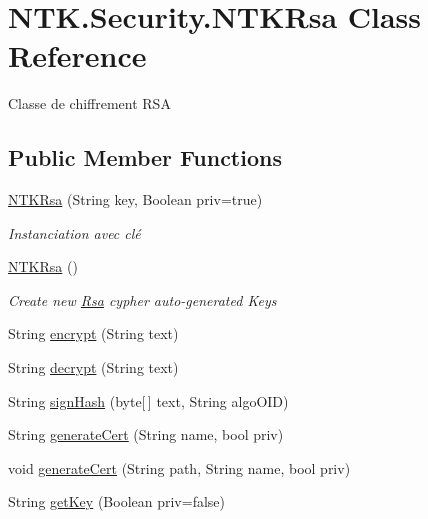 \hypertarget{class_n_t_k_1_1_security_1_1_n_t_k_rsa}{}\section{N\+T\+K.\+Security.\+N\+T\+K\+Rsa Class Reference}
\label{class_n_t_k_1_1_security_1_1_n_t_k_rsa}


Classe de chiffrement R\+SA  


\subsection*{Public Member Functions}
\begin{DoxyCompactItemize}
\item 
\mbox{\hyperlink{class_n_t_k_1_1_security_1_1_n_t_k_rsa_a0b7a720efb1a3d7dad4244581917147c}{N\+T\+K\+Rsa}} (String key, Boolean priv=true)
\begin{DoxyCompactList}\small\item\em Instanciation avec clé \end{DoxyCompactList}\item 
\mbox{\hyperlink{class_n_t_k_1_1_security_1_1_n_t_k_rsa_a9d4783190577624f5db69a347f19a320}{N\+T\+K\+Rsa}} ()
\begin{DoxyCompactList}\small\item\em Create new \mbox{\hyperlink{class_n_t_k_1_1_security_1_1_rsa}{Rsa}} cypher auto-\/generated Keys \end{DoxyCompactList}\item 
String \mbox{\hyperlink{class_n_t_k_1_1_security_1_1_n_t_k_rsa_a855354d25d5a6bca73a81f36eec4cc06}{encrypt}} (String text)
\item 
String \mbox{\hyperlink{class_n_t_k_1_1_security_1_1_n_t_k_rsa_a14aece6cdb625bacfdc1c0118e93f7e2}{decrypt}} (String text)
\item 
String \mbox{\hyperlink{class_n_t_k_1_1_security_1_1_n_t_k_rsa_a85a303ed3c2bb3f949c95acb497959d0}{sign\+Hash}} (byte\mbox{[}$\,$\mbox{]} text, String algo\+O\+ID)
\item 
String \mbox{\hyperlink{class_n_t_k_1_1_security_1_1_n_t_k_rsa_a2b527b5144ec43b8616cbfbb33f8b0e0}{generate\+Cert}} (String name, bool priv)
\item 
void \mbox{\hyperlink{class_n_t_k_1_1_security_1_1_n_t_k_rsa_abfa79fc246f10de191a6885832446659}{generate\+Cert}} (String path, String name, bool priv)
\item 
String \mbox{\hyperlink{class_n_t_k_1_1_security_1_1_n_t_k_rsa_a1f4752cdd8ba8ea551da3b57b26e3089}{get\+Key}} (Boolean priv=false)
\end{DoxyCompactItemize}


